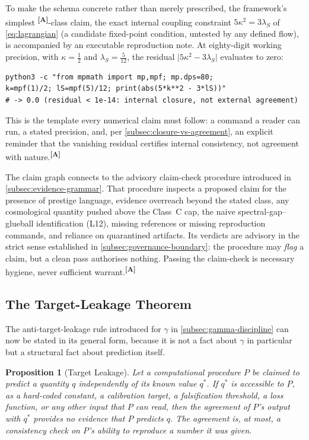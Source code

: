 \documentclass[12pt,a4paper,twoside]{article}
\theoremstyle{plain}
\newtheorem{proposition}[theorem]{Proposition}
\theoremstyle{definition}
\theoremstyle{remark}
\newcommand{\catmark}[1]{\textsuperscript{\textsf{\textbf{[#1]}}}}
\begin{document}
To make the schema concrete rather than merely prescribed, the framework's simplest \catmark{A}-class claim, the exact internal coupling constraint $5\kappa^2 = 3\lambda_S$ of \cref{eq:lagrangian} (a candidate fixed-point condition, untested by any defined flow), is accompanied by an executable reproduction note. At eighty-digit working precision, with $\kappa = \tfrac{1}{2}$ and $\lambda_S = \tfrac{5}{12}$, the residual $\lvert 5\kappa^2 - 3\lambda_S\rvert$ evaluates to zero:
\begin{verbatim}
python3 -c "from mpmath import mp,mpf; mp.dps=80;
k=mpf(1)/2; lS=mpf(5)/12; print(abs(5*k**2 - 3*lS))"
# -> 0.0 (residual < 1e-14: internal closure, not external agreement)
\end{verbatim}
This is the template every numerical claim must follow: a command a reader can run, a stated precision, and, per \cref{subsec:closure-vs-agreement}, an explicit reminder that the vanishing residual certifies internal consistency, not agreement with nature.\catmark{A}

The claim graph connects to the advisory claim-check procedure introduced in \cref{subsec:evidence-grammar}. That procedure inspects a proposed claim for the presence of prestige language, evidence overreach beyond the stated class, any cosmological quantity pushed above the Class~C cap, the naive spectral-gap--glueball identification (L12), missing references or missing reproduction commands, and reliance on quarantined artifacts. Its verdicts are advisory in the strict sense established in \cref{subsec:governance-boundary}: the procedure may \emph{flag} a claim, but a clean pass authorises nothing. Passing the claim-check is necessary hygiene, never sufficient warrant.\catmark{A}

\subsection{The Target-Leakage Theorem}
\label{subsec:target-leakage-theorem}

The anti-target-leakage rule introduced for $\gamma$ in \cref{subsec:gamma-discipline} can now be stated in its general form, because it is not a fact about $\gamma$ in particular but a structural fact about prediction itself.

\begin{proposition}[Target Leakage]
\label{prop:target-leakage}
Let a computational procedure $P$ be claimed to predict a quantity $q$ independently of its known value $q^{\ast}$. If $q^{\ast}$ is accessible to $P$, as a hard-coded constant, a calibration target, a falsification threshold, a loss function, or any other input that $P$ can read, then the agreement of $P$'s output with $q^{\ast}$ provides no evidence that $P$ predicts $q$. The agreement is, at most, a consistency check on $P$'s ability to reproduce a number it was given.
\end{proposition}
\end{document}
